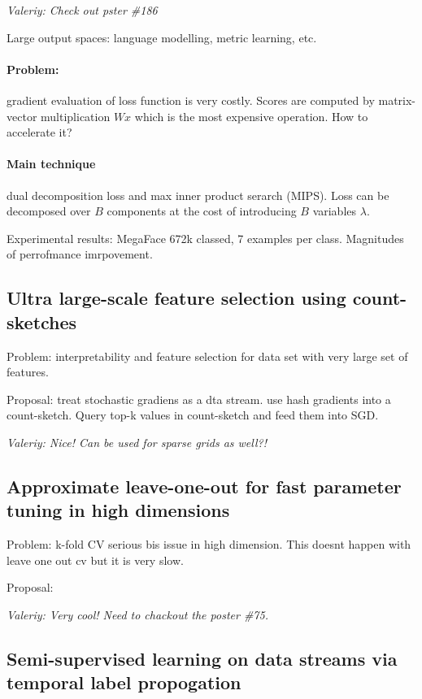 \documentclass[11pt,oneside,a4paper]{scrartcl}
\newcommand{\valeriy}[1]{{\color{blue}\textit{Valeriy: #1}}}
\begin{document}
\valeriy{Check out pster \#186}

Large output spaces: language modelling, metric learning, etc.

\paragraph{Problem:}
gradient evaluation of loss function is very costly.
Scores are computed by matrix-vector multiplication $Wx$ which is the
most expensive operation. How to accelerate it?

\paragraph{Main technique} dual decomposition loss and max inner
product serarch (MIPS).  Loss can be decomposed over $B$ components at
the cost of introducing $B$ variables $\lambda$.

Experimental results: MegaFace 672k classed, 7 examples per
class. Magnitudes of perrofmance imrpovement. 


\subsection{Ultra large-scale feature selection using count-sketches \cite{aghazadeh18a}}
\label{sec:ultra-large-scale}

Problem: interpretability and feature selection for data set with very
large set of features.

Proposal: treat stochastic gradiens as a dta stream. use hash
gradients into a count-sketch. Query top-k values in count-sketch and
feed them into SGD.

\valeriy{Nice! Can be used for sparse grids as well?!}


\subsection{Approximate leave-one-out for fast parameter tuning in
  high dimensions \cite{wang18m}}
\label{sec:appr-leave-one}

Problem: k-fold CV serious bis issue in high dimension. This doesnt
happen with leave one out cv but it is very slow.

Proposal: 

\valeriy{Very cool! Need to chackout the poster \#75.}

\subsection{Semi-supervised learning on data streams via temporal
  label propogation}
\label{sec:semi-superv-learn}
\end{document}
